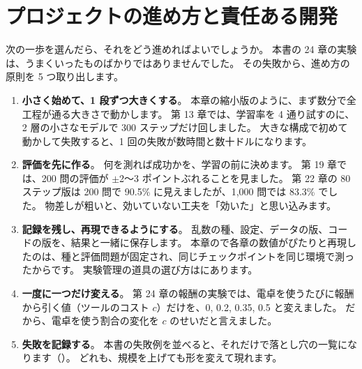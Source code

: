 \section{プロジェクトの進め方と責任ある開発}\label{sec:cap-project}

次の一歩を選んだら、それをどう進めればよいでしょうか。
本書の 24 章の実験は、うまくいったものばかりではありませんでした。
その失敗から、進め方の原則を 5 つ取り出します。

\begin{enumerate}
\item \textbf{小さく始めて、1 段ずつ大きくする}。
本章の縮小版のように、まず数分で全工程が通る大きさで動かします。
第 13 章では、学習率を 4 通り試すのに、2 層の小さなモデルで 300 ステップだけ回しました。
大きな構成で初めて動かして失敗すると、1 回の失敗が数時間と数十ドルになります。
\item \textbf{評価を先に作る}。
何を測れば成功かを、学習の前に決めます。
第 19 章では、200 問の評価が $\pm$2〜3 ポイントぶれることを見ました。
第 22 章の 80 ステップ版は 200 問で 90.5\% に見えましたが、1,000 問では 83.3\% でした。
物差しが粗いと、効いていない工夫を「効いた」と思い込みます。
\item \textbf{記録を残し、再現できるようにする}。
乱数の種、設定、データの版、コードの版を、結果と一緒に保存します。
本章ので各章の数値がぴたりと再現したのは、種と評価問題が固定され、同じチェックポイントを同じ環境で測ったからです。
実験管理の道具の選び方はにあります。
\item \textbf{一度に一つだけ変える}。
第 24 章の報酬の実験では、電卓を使うたびに報酬から引く値（ツールのコスト $c$）だけを、0, 0.2, 0.35, 0.5 と変えました。
だから、電卓を使う割合の変化を $c$ のせいだと言えました。
\item \textbf{失敗を記録する}。
本書の失敗例を並べると、それだけで落とし穴の一覧になります（）。
どれも、規模を上げても形を変えて現れます。
\end{enumerate}

